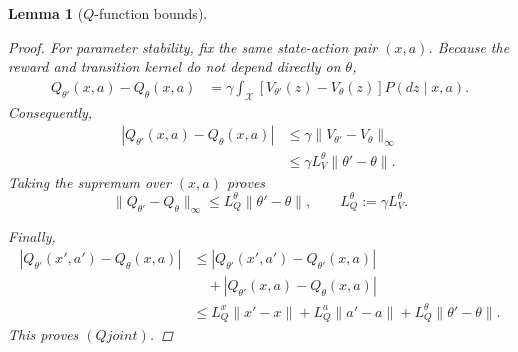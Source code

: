 \documentclass{article}
\newtheorem{lem}[thm]{Lemma}
\theoremstyle{definition}
\theoremstyle{remark}
\theoremstyle{mystyle}
\newcommand{\1}{\mathbbm{1}}
\begin{document}
\begin{lem}[\(Q\)-function bounds]
\begin{proof}
For parameter stability, fix the same state-action pair \((x,a)\).
Because the reward and transition kernel do not depend directly on
\(\theta\),
\[
\begin{aligned}
Q_{\theta'}(x,a)-Q_\theta(x,a)
&=
\gamma
\int_{\mathcal X}
\left[
V_{\theta'}(z)-V_\theta(z)
\right]
P(dz\mid x,a).
\end{aligned}
\]
Consequently,
\[
\begin{aligned}
|Q_{\theta'}(x,a)-Q_\theta(x,a)|
&\le
\gamma
\|V_{\theta'}-V_\theta\|_\infty
\\
&\le
\gamma L_V^\theta\|\theta'-\theta\|.
\end{aligned}
\]
Taking the supremum over \((x,a)\) proves
\[
\|Q_{\theta'}-Q_\theta\|_\infty
\le
L_Q^\theta\|\theta'-\theta\|,
\qquad
L_Q^\theta:=\gamma L_V^\theta.
\]

Finally,
\[
\begin{aligned}
|Q_{\theta'}(x',a')-Q_\theta(x,a)|
&\le
|Q_{\theta'}(x',a')-Q_{\theta'}(x,a)|
\\
&\quad+
|Q_{\theta'}(x,a)-Q_\theta(x,a)|
\\
&\le
L_Q^x\|x'-x\|
+
L_Q^a\|a'-a\|
+
L_Q^\theta\|\theta'-\theta\|.
\end{aligned}
\]
This proves \((Qjoint)\).
\end{proof}
\end{lem}
\end{document}
